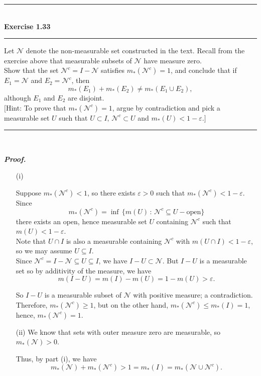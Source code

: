 \documentclass[a4paper,11pt]{article}
\begin{document}
\begin{flushleft}
	\rule[-0.5ex]{17cm}{2pt}\\
		\textbf{Exercise 1.33}\\
	\rule[1.5ex]{17cm}{0.5pt}
		Let $\mathcal{N}$ denote the non-measurable set constructed in the text. Recall from the exercise above that measurable subsets of $\mathcal{N}$ have measure zero.\\

		Show that the set $\mathcal{N}^c = I - \mathcal{N}$ satisfies $m_*(\mathcal{N}^c) = 1$, and conclude that if $E_1 = \mathcal{N}$ and $E_2 = \mathcal{N}^c$, then
			$$m_*(E_1) + m_*(E_2) \neq m_*(E_1 \cup E_2),$$
		although $E_1$ and $E_2$ are disjoint.\\

		$[$Hint: To prove that $m_*(\mathcal{N}^c) = 1$, argue by contradiction and pick a measurable set $U$ such that $U \subset I,\,\mathcal{N}^c \subset U$ and $m_*(U) < 1 - \varepsilon.]$
	\rule[1.0ex]{17cm}{0.5pt}\
\end{flushleft}

\textbf{\textit{Proof.}}

\begin{enumerate}

	\item [(i)]

		Suppose $m_*(\mathcal{N}^c) < 1$, so there exists $\varepsilon > 0$ such that $m_*(\mathcal{N}^c) < 1 - \varepsilon$. Since
			$$m_*(\mathcal{N}^c) = \inf\,\{m(U)\,:\,\mathcal{N}^c \subseteq U-\text{open}\}$$
		there exists an open, hence measurable set $U$ containing $\mathcal{N}^c$ such that $m(U) < 1 - \varepsilon$.\\

		Note that $U \cap I$ is also a measurable containing $\mathcal{N}^c$ with $m(U \cap I) < 1 - \varepsilon$, so we may assume $U \subseteq I$.\\

		Since $\mathcal{N}^c = I - \mathcal{N} \subseteq U \subseteq I$, we have $I - U \subset \mathcal{N}$. But $I - U$ is a measurable set so by additivity of the measure, we have
			$$m(I - U) = m(I) - m(U) = 1 - m(U) > \varepsilon.$$

		So $I - U$ is a measurable subset of $\mathcal{N}$ with positive measure; a contradiction.\\

		Therefore, $m_*(\mathcal{N}^c) \geq 1$, but on the other hand, $m_*(\mathcal{N}^c) \leq m_*(I) = 1$, hence, $m_*(\mathcal{N}^c) = 1$.\\

	\item [(ii)]
		We know that sets with outer measure zero are measurable, so $m_*(\mathcal{N}) > 0$.

		Thus, by part (i), we have
			$$m_*(\mathcal{N}) + m_*(\mathcal{N}^c) > 1 = m_*(I) = m_*(\mathcal{N} \cup \mathcal{N}^c).$$\\\\

\end{enumerate}
\end{document}
